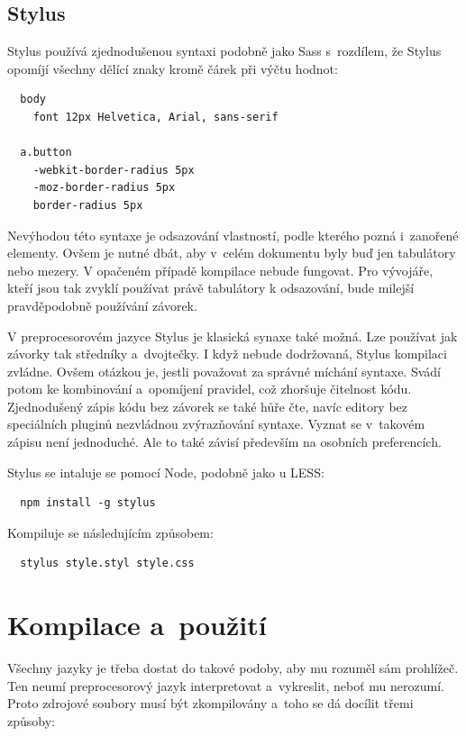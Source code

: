 \documentclass[thesis=B,czech]{FITthesis}[2012/06/26]
\begin{document}
\subsection{Stylus}

Stylus používá zjednodušenou syntaxi podobně jako Sass s~rozdílem, že Stylus opomíjí všechny dělící znaky kromě čárek při výčtu hodnot:
\scriptsize
\begin{verbatim}
  body
    font 12px Helvetica, Arial, sans-serif

  a.button
    -webkit-border-radius 5px
    -moz-border-radius 5px
    border-radius 5px
\end{verbatim}
\normalsize
Nevýhodou této syntaxe je odsazování vlastností, podle kterého pozná i~zanořené elementy. Ovšem  je nutné dbát, aby v~celém dokumentu byly buď jen tabulátory nebo mezery. V opačeném případě kompilace nebude fungovat. Pro vývojáře, kteří jsou tak zvyklí používat právě tabulátory k odsazování, bude milejší pravděpodobně používání závorek. 

V preprocesorovém jazyce Stylus je klasická synaxe také možná. Lze používat jak závorky tak středníky a~dvojtečky. I když nebude dodržovaná, Stylus kompilaci zvládne. Ovšem otázkou je, jestli považovat za správné míchání syntaxe. Svádí potom ke kombinování a~opomíjení pravidel, což zhoršuje čitelnost kódu. Zjednodušený zápis kódu bez závorek se také hůře čte, navíc editory bez speciálních pluginů nezvládnou zvýrazňování syntaxe. Vyznat se v~takovém zápisu není jednoduché. Ale to také závisí především na osobních preferencích.

Stylus se intaluje se pomocí Node, podobně jako u LESS:
\scriptsize
\begin{verbatim}
  npm install -g stylus
\end{verbatim}
\normalsize
Kompiluje se následujícím způsobem:
\scriptsize
\begin{verbatim}
  stylus style.styl style.css
\end{verbatim}
\normalsize


\section{Kompilace a~použití}
\label{sec:comp}


Všechny jazyky je třeba dostat do takové podoby, aby mu rozuměl sám prohlížeč. Ten neumí  preprocesorový jazyk interpretovat a~vykreslit, neboť mu nerozumí. Proto zdrojové soubory musí být zkompilovány a~toho se dá docílit třemi způsoby:
\end{document}
